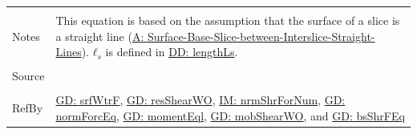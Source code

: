 \documentclass[12pt]{article}
\begin{document}
\begin{minipage}{\textwidth}
\begin{tabular}{>{\raggedright}p{}>{\raggedright\arraybackslash}p{}}
          \\ \midrule \\
          Notes & This equation is based on the assumption that the surface of a slice is a straight line (\hyperref[assumpSBSBISL]{A: Surface-Base-Slice-between-Interslice-Straight-Lines}). ${\mathbf{ℓ}_{s}}$ is defined in \hyperref[DD:lengthLs]{DD: lengthLs}.
          \\ \midrule \\
          Source & \cite{fredlund1977}
          \\ \midrule \\
          RefBy & \hyperref[GD:srfWtrF]{GD: srfWtrF}, \hyperref[GD:resShearWO]{GD: resShearWO}, \hyperref[IM:nrmShrForNum]{IM: nrmShrForNum}, \hyperref[GD:normForcEq]{GD: normForcEq}, \hyperref[GD:momentEql]{GD: momentEql}, \hyperref[GD:mobShearWO]{GD: mobShearWO}, and \hyperref[GD:bsShrFEq]{GD: bsShrFEq}
          \\ \bottomrule
          \end{tabular}
          \end{minipage}
\end{document}

